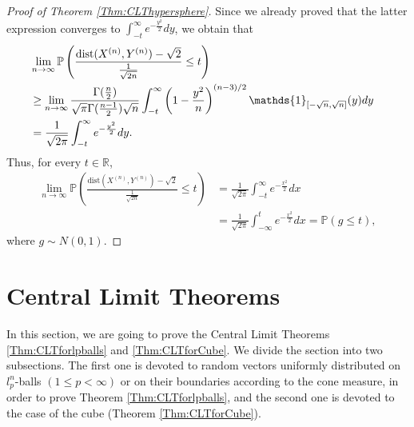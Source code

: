\documentclass[10pt]{amsart}
\def\R{\mathbb{R}}
\def\dist{\text{dist}}
\numberwithin{equation}{section}
\begin{document}
\begin{proof}[Proof of Theorem \ref{Thm:CLThypersphere}]
Since we already proved that the latter expression converges to $\int_{ - t }^{\infty} e^{-\frac{y^2}{2}} dy$, we obtain that
\begin{align*}
& \lim _{n \to \infty} \mathbb{P} \left(\frac{\dist(X^{(n)},Y^{(n)}) - \sqrt{2}}{\frac{1}{\sqrt{2n}}} \leq t\right) \cr
& \geq  \lim _{n \to \infty} \frac{\Gamma ( \frac{n}{2} ) }{ \sqrt{\pi} \Gamma ( \frac{n-1}{2} ) \sqrt{n}}  \int_{-t}^{\infty} \left( 1- \frac{y^2}{n} \right)^{(n-3)/2} \mathds{1}_{[-\sqrt{n} , \sqrt{n}]} (y) dy \cr
& =  \frac{1}{\sqrt{2 \pi}} 
 \int_{ - t }^{\infty} e^{-\frac{y^2}{2}} dy .
\end{align*}
Thus, for every $t\in \R$,
\begin{align*}
\lim _{n \to\infty } \mathbb{P} \left(\frac{\dist(X^{(n)},Y^{(n)}) - \sqrt{2}}{\frac{1}{\sqrt{2n}}} \leq t\right) & =
 \frac{1}{\sqrt{2 \pi}} 
 \int_{ - t }^{\infty} e^{-\frac{x^2}{2}} dx
 \\
 & = \frac{1}{\sqrt{2 \pi}} 
 \int_{ - \infty }^{t} e^{-\frac{x^2}{2}} dx = \mathbb{P} \left(g \leq t\right),
\end{align*}
where $g \sim N(0,1)$.
\end{proof}


\section{Central Limit Theorems}
\label{section4}

In this section, we are going to prove the Central Limit Theorems \ref{Thm:CLTforlpballs} and \ref{Thm:CLTforCube}. We divide the section into two subsections. The first one is devoted to random vectors uniformly distributed on $l_p^n$-balls $(1 \leq p < \infty)$ or on their boundaries according to the cone measure, in order to prove Theorem \ref{Thm:CLTforlpballs}, and the second one is devoted to the case of the cube (Theorem \ref{Thm:CLTforCube}).
\end{document}
